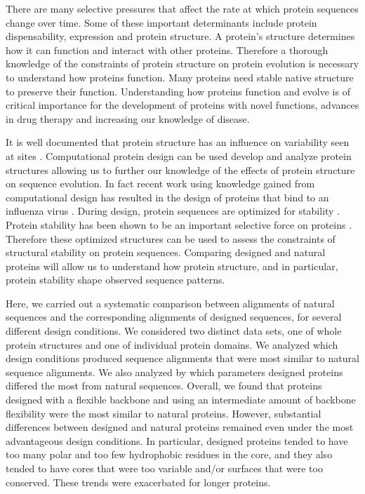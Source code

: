 \documentclass[12pt]{article}
\begin{document}
{\color{blue}
There are many selective pressures that affect the rate at which protein sequences change over time. Some of these important determinants include protein dispensability, expression and protein structure. A protein's structure determines how it can function and interact with other proteins.  Therefore a thorough knowledge of the constraints of protein structure on protein evolution is necessary to understand how proteins function. Many proteins need stable native structure to preserve their function. Understanding how proteins function and evolve is of critical importance for the development of proteins with novel functions, advances in drug therapy and increasing our knowledge of disease.  
}

{\color{blue}
It is well documented that protein structure has an influence on variability seen at sites \cite{Franzosa2009, Ramsey2011}. Computational protein design can be used develop and analyze protein structures allowing us to further our knowledge of the effects of protein structure on sequence evolution. In fact recent work using knowledge gained from computational design has resulted in the design of proteins that bind to an influenza virus \cite{Fleishman2011}. During design, protein sequences are optimized for stability \cite{Butterfoss2006, Das2008}. Protein stability has been shown to be an important selective force on proteins \cite{Drummond2008}. Therefore these optimized structures can be used to assess the constraints of structural stability on protein sequences. Comparing designed and natural proteins will allow us to understand how protein structure, and in particular, protein stability shape observed sequence patterns.
}


Here, we carried out a systematic comparison between alignments of natural sequences and the corresponding alignments of designed sequences, for several different design conditions. We considered two distinct data sets, one of whole protein structures and one of individual protein domains. We analyzed which design conditions produced sequence alignments that were most similar to natural sequence alignments. We also analyzed by which parameters designed proteins differed the most from natural sequences. Overall, we found that proteins designed with a flexible backbone and using an intermediate amount of backbone flexibility were the most similar to natural proteins. However, substantial differences between designed and natural proteins remained even under the most advantageous design conditions. In particular, designed proteins tended to have too many polar and too few hydrophobic residues in the core, and they also tended to have cores that were too variable and/or surfaces that were too conserved. These trends were exacerbated for longer proteins.
\end{document}
